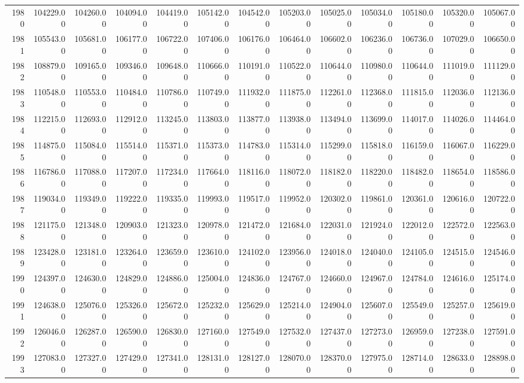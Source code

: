 \begin{longtable}{rrrrrrrrrrrrr}
  1980 & 104229.00 & 104260.00 & 104094.00 & 104419.00 & 105142.00 & 104542.00 & 105203.00 & 105025.00 & 105034.00 & 105180.00 & 105320.00 & 105067.00 \\ 
  1981 & 105543.00 & 105681.00 & 106177.00 & 106722.00 & 107406.00 & 106176.00 & 106464.00 & 106602.00 & 106236.00 & 106736.00 & 107029.00 & 106650.00 \\ 
  1982 & 108879.00 & 109165.00 & 109346.00 & 109648.00 & 110666.00 & 110191.00 & 110522.00 & 110644.00 & 110980.00 & 110644.00 & 111019.00 & 111129.00 \\ 
  1983 & 110548.00 & 110553.00 & 110484.00 & 110786.00 & 110749.00 & 111932.00 & 111875.00 & 112261.00 & 112368.00 & 111815.00 & 112036.00 & 112136.00 \\ 
  1984 & 112215.00 & 112693.00 & 112912.00 & 113245.00 & 113803.00 & 113877.00 & 113938.00 & 113494.00 & 113699.00 & 114017.00 & 114026.00 & 114464.00 \\ 
  1985 & 114875.00 & 115084.00 & 115514.00 & 115371.00 & 115373.00 & 114783.00 & 115314.00 & 115299.00 & 115818.00 & 116159.00 & 116067.00 & 116229.00 \\ 
  1986 & 116786.00 & 117088.00 & 117207.00 & 117234.00 & 117664.00 & 118116.00 & 118072.00 & 118182.00 & 118220.00 & 118482.00 & 118654.00 & 118586.00 \\ 
  1987 & 119034.00 & 119349.00 & 119222.00 & 119335.00 & 119993.00 & 119517.00 & 119952.00 & 120302.00 & 119861.00 & 120361.00 & 120616.00 & 120722.00 \\ 
  1988 & 121175.00 & 121348.00 & 120903.00 & 121323.00 & 120978.00 & 121472.00 & 121684.00 & 122031.00 & 121924.00 & 122012.00 & 122572.00 & 122563.00 \\ 
  1989 & 123428.00 & 123181.00 & 123264.00 & 123659.00 & 123610.00 & 124102.00 & 123956.00 & 124018.00 & 124040.00 & 124105.00 & 124515.00 & 124546.00 \\ 
  1990 & 124397.00 & 124630.00 & 124829.00 & 124886.00 & 125004.00 & 124836.00 & 124767.00 & 124660.00 & 124967.00 & 124784.00 & 124616.00 & 125174.00 \\ 
  1991 & 124638.00 & 125076.00 & 125326.00 & 125672.00 & 125232.00 & 125629.00 & 125214.00 & 124904.00 & 125607.00 & 125549.00 & 125257.00 & 125619.00 \\ 
  1992 & 126046.00 & 126287.00 & 126590.00 & 126830.00 & 127160.00 & 127549.00 & 127532.00 & 127437.00 & 127273.00 & 126959.00 & 127238.00 & 127591.00 \\ 
  1993 & 127083.00 & 127327.00 & 127429.00 & 127341.00 & 128131.00 & 128127.00 & 128070.00 & 128370.00 & 127975.00 & 128714.00 & 128633.00 & 128898.00 \\ 

\end{longtable}
